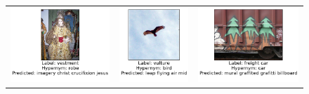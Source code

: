\begin{figure}
\begin{tabular}{ccc}
\includegraphics[scale=0.23]{chapters/TAL/imagenet/mary} & \includegraphics[scale=0.23]{chapters/TAL/imagenet/eagle} & \includegraphics[scale=0.23]{chapters/TAL/imagenet/graffiti} \\

\end{tabular}
\end{figure}
